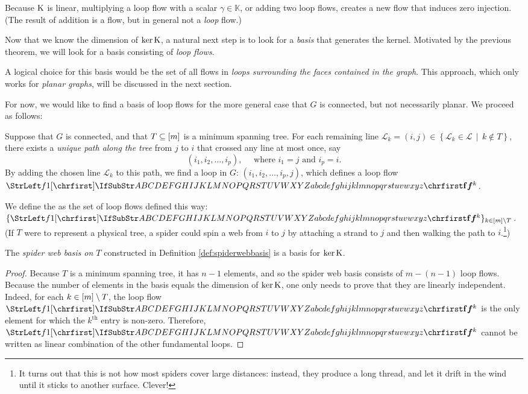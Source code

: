 \documentclass[main.tex]{subfiles}
\begin{document}
\begin{remark}
Because $\text{\textup{K}}$ is linear, multiplying a loop flow with a scalar $\gamma \in \mathbb{K}$, or adding two loop flows, creates a new flow that induces zero injection. (The result of addition is a flow, but in general not a \emph{loop} flow.)
\end{remark}

Now that we know the dimension of $\ker \text{\textup{K}}$, a natural next step is to look for a \emph{basis} that generates the kernel. Motivated by the previous theorem, we will look for a basis consisting of \emph{loop flows}.

A logical choice for this basis would be the set of all flows in \emph{loops surrounding the faces contained in the graph}. This approach, which only works for \emph{planar graphs}, will be discussed in the next section.

For now, we would like to find a basis of loop flows for the more general case that $G$ is connected, but not necessarily planar. We proceed as follows:

\begin{definition}\label{def:spiderwebbasis}
Suppose that $G$ is connected, and that $T \subseteq [m]$ is a minimum spanning tree. For each remaining line $\mathcal{L}_k = (i,j) \in \left\lbrace \mathcal{L}_k \in \mathcal{L} \, \mid \, k \notin  T \right\rbrace $, there exists a \emph{unique path along the tree} from $j$ to $i$ that crossed any line at most once, say 
\[
(i_1, i_2, \dots, i_p),\quad\text{ where $i_1=j$ and $i_p=i$.}
\]
By adding the chosen line $\mathcal{L}_k$ to this path, we find a loop in $G$: $(i_1, i_2, \dots, i_p, j)$, which defines a loop flow $\mat{f}^k$. 

We define the  as the set of loop flows defined this way: $\{ \mat{f}^k \}_{k \in \range{m} \setminus T}$. (If $T$ were to represent a physical tree, a spider could spin a web from $i$ to $j$ by attaching a strand to $j$ and then walking the path to $i$.\footnote{It turns out that this is not how most spiders cover large distances: instead, they produce a long thread, and let it drift in the wind until it sticks to another surface. Clever!})
\end{definition}

\begin{theorem}
The \emph{spider web basis on $T$} constructed in Definition \ref{def:spiderwebbasis} is a basis for $\ker \text{\textup{K}}$.
\end{theorem}
\begin{proof}
Because $T$ is a minimum spanning tree, it has $n-1$ elements, and so the spider web basis consists of $m - (n-1)$ loop flows.
Because the number of elements in the basis equals the dimension of $\ker \text{\textup{K}}$, one only needs to prove that they are linearly independent. Indeed, for each $k \in [m]\setminus T$, the loop flow $\mat{f}^k$ is the only element for which the $k^{\text{th}}$ entry is non-zero. Therefore, $\mat{f}^k$ cannot be written as linear combination of the other fundamental loops.
\end{proof}
\end{document}
